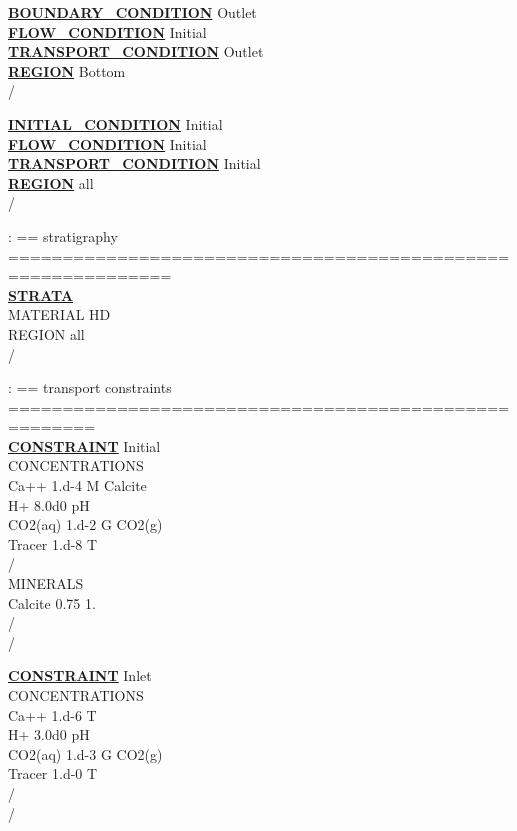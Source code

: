 \documentclass[12pt]{article}
\begin{document}
\noindent
\hyperlink{target_bcon}{\bf BOUNDARY\_CONDITION} Outlet\\
\hyperlink{target_flow_cond}{\bf FLOW\_CONDITION} Initial\\
\hyperlink{target_trans_cond}{\bf TRANSPORT\_CONDITION} Outlet\\
\hyperlink{target_region}{\bf REGION} Bottom\\
/

\noindent
\hyperlink{target_init}{\bf INITIAL\_CONDITION} Initial\\
\hyperlink{target_flow_cond}{\bf FLOW\_CONDITION} Initial\\
\hyperlink{target_trans_cond}{\bf TRANSPORT\_CONDITION} Initial\\
\hyperlink{target_region}{\bf REGION} all\\
/

\noindent
: == stratigraphy =============================================================\\
\hyperlink{target_strata}{\bf STRATA}\\
MATERIAL HD\\
REGION all\\
/

\noindent
: == transport constraints ======================================================\\
\hyperlink{target_constraint}{\bf CONSTRAINT} Initial\\
CONCENTRATIONS\\
Ca++    1.d-4   M  Calcite\\
H+      8.0d0  pH\\
CO2(aq) 1.d-2   G  CO2(g)\\
Tracer  1.d-8   T\\
/\\
MINERALS\\
Calcite    0.75  1.\\
/\\
/

\noindent
\hyperlink{target_constraint}{\bf CONSTRAINT} Inlet\\
CONCENTRATIONS\\
Ca++    1.d-6   T\\
H+      3.0d0  pH\\
CO2(aq) 1.d-3   G  CO2(g)\\
Tracer  1.d-0   T\\
/\\
/
\normalsize

\newpage
\protect\hypertarget{target_bcon}{}
\end{document}
